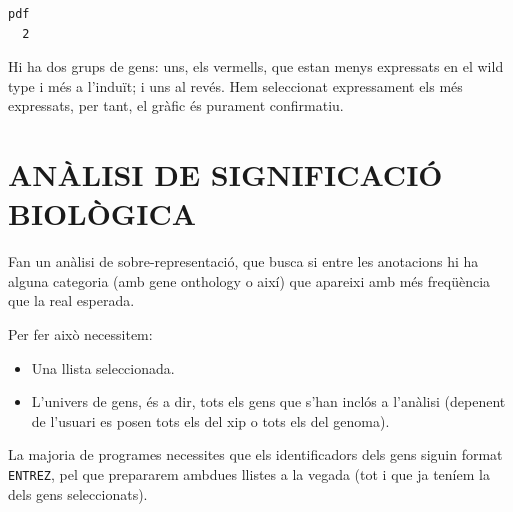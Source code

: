 \documentclass[
]{article}
\begin{document}
\begin{verbatim}
pdf 
  2 
\end{verbatim}

Hi ha dos grups de gens: uns, els vermells, que estan menys expressats
en el wild type i més a l'induït; i uns al revés. Hem seleccionat
expressament els més expressats, per tant, el gràfic és purament
confirmatiu.

\section{ANÀLISI DE SIGNIFICACIÓ
BIOLÒGICA}\label{anuxe0lisi-de-significaciuxf3-bioluxf2gica}

Fan un anàlisi de sobre-representació, que busca si entre les anotacions
hi ha alguna categoria (amb gene onthology o així) que apareixi amb més
freqüència que la real esperada.

Per fer això necessitem:

\begin{itemize}
\item
  Una llista seleccionada.
\item
  L'univers de gens, és a dir, tots els gens que s'han inclós a
  l'anàlisi (depenent de l'usuari es posen tots els del xip o tots els
  del genoma).
\end{itemize}

La majoria de programes necessites que els identificadors dels gens
siguin format \texttt{ENTREZ}, pel que prepararem ambdues llistes a la
vegada (tot i que ja teníem la dels gens seleccionats).
\end{document}
